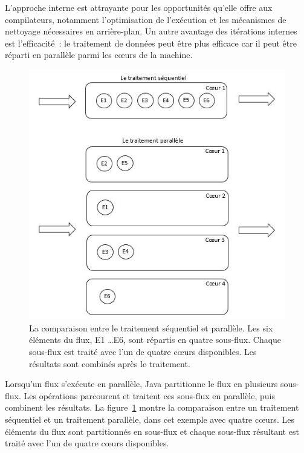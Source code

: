 L'approche interne est attrayante pour les opportunit\'es qu'elle offre aux compilateurs, notamment l'optimisation de l'exécution et les m\'ecanismes de nettoyage n\'ecessaires en arri\`ere-plan. Un autre avantage des it\'erations internes est l'efficacit\'e~: le traitement de donn\'ees peut \^etre plus efficace car il peut \^etre r\'eparti en parall\`ele parmi les cœurs de la machine.


\begin{figure}
\centering
     \includegraphics[width=1.0\textwidth]{Figures/ComparisonSequentialVsParallel.jpg}
      \caption[La comparaison entre le traitement s\'equentiel et parall\`ele.]{La comparaison entre le traitement s\'equentiel et parall\`ele. Les six \'el\'ements du flux, E1 \ldots E6, sont r\'epartis en quatre sous-flux. Chaque sous-flux est trait\'e avec l'un de quatre cœurs disponibles. Les r\'esultats sont combin\'es apr\`es le traitement.}
       \label{ComparisonSequentialVsParallel.fig}
\end{figure}


Lorsqu'un flux s'ex\'ecute en parall\`ele, Java partitionne le flux en plusieurs sous-flux. Les op\'erations parcourent et traitent ces sous-flux en parall\`ele, puis combinent les r\'esultats. La figure~\ref{ComparisonSequentialVsParallel.fig} montre la comparaison entre  un traitement s\'equentiel et un traitement parall\`ele, dans cet exemple avec quatre c\oe{}urs. Les \'el\'ements du flux sont partitionn\'es en sous-flux et chaque sous-flux r\'esultant est trait\'e avec l'un de quatre cœurs disponibles.  



